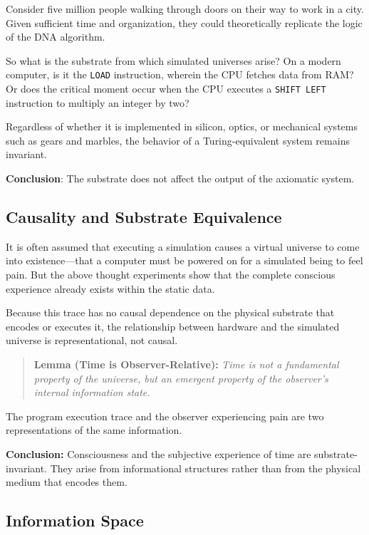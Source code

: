 \documentclass[11pt]{article}
\begin{document}
Consider five million people walking through doors on their way to work in a city. Given sufficient time and organization, they could theoretically replicate the logic of the DNA algorithm.

So what is the substrate from which simulated universes arise? On a modern computer, is it the \texttt{LOAD} instruction, wherein the CPU fetches data from RAM? Or does the critical moment occur when the CPU executes a \texttt{SHIFT LEFT} instruction to multiply an integer by two?

Regardless of whether it is implemented in silicon, optics, or mechanical systems such as gears and marbles, the behavior of a Turing-equivalent system remains invariant.

\textbf{Conclusion}: The substrate does not affect the output of the axiomatic system.



\subsection{Causality and Substrate Equivalence}

It is often assumed that executing a simulation causes a virtual universe to come into existence—that a computer must be powered on for a simulated being to feel pain. But the above thought experiments show that the complete conscious experience already exists within the static data.

Because this trace has no causal dependence on the physical substrate that encodes or executes it, the relationship between hardware and the simulated universe is representational, not causal.

\begin{quote}
  \textbf{Lemma (Time is Observer-Relative):} \emph{Time is not a fundamental property of the universe, but an emergent property of the observer’s internal information state.}
\end{quote}

The program execution trace and the observer experiencing pain are two representations of the same information.

\textbf{Conclusion:} Consciousness and the subjective experience of time are substrate-invariant. They arise from informational structures rather than from the physical medium that encodes them.



\subsection{Information Space}
\end{document}
